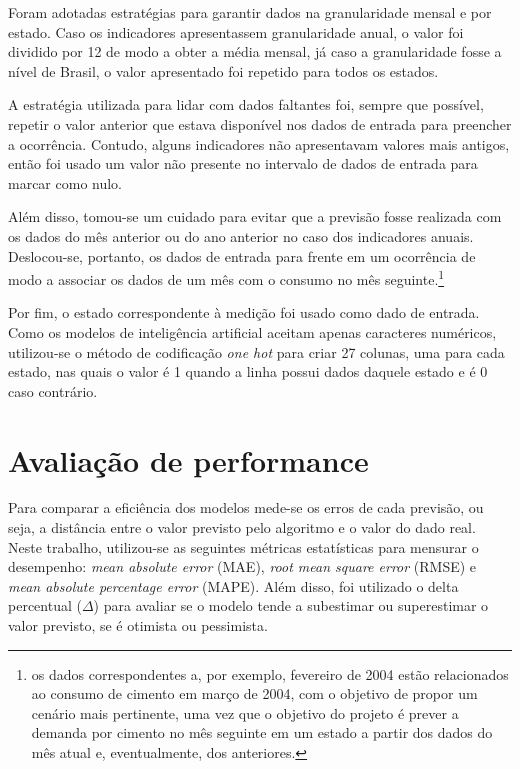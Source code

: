 Foram adotadas estratégias para garantir dados na granularidade
mensal e por estado. Caso os indicadores apresentassem granularidade anual, 
o valor foi dividido por 12 de modo a obter a média mensal, já caso a granularidade
fosse a nível de Brasil, o valor apresentado foi repetido para todos os 
estados.


A estratégia utilizada para lidar com dados faltantes foi, sempre que possível,
repetir o valor anterior que estava disponível nos dados de entrada para
preencher a ocorrência. Contudo, alguns indicadores não apresentavam 
valores mais antigos, então foi usado um valor não presente no intervalo
de dados de entrada para marcar como nulo.

Além disso, tomou-se um cuidado para evitar que a previsão fosse 
realizada com os dados do mês anterior ou do ano anterior no caso dos
indicadores anuais. Deslocou-se, portanto, os dados de entrada 
para frente em um ocorrência de modo a associar os dados de um 
mês com o consumo no mês seguinte.\footnote{os dados correspondentes 
a, por exemplo, fevereiro de 2004 estão relacionados ao consumo de 
cimento em março de 2004, com o objetivo de propor um cenário mais pertinente, 
uma vez que o objetivo do projeto é prever a demanda por cimento no mês seguinte 
em um estado a partir dos dados do mês atual e, eventualmente, dos anteriores.
}

Por fim, o estado correspondente à medição foi usado como dado de entrada. 
Como os modelos de inteligência artificial aceitam apenas caracteres numéricos,
utilizou-se o método de codificação \textit{one hot} para criar 27 colunas, uma
para cada estado, nas quais o valor é 1 quando a linha possui dados daquele estado 
e é 0 caso contrário.


    \section{Avaliação de performance}

    Para comparar a eficiência dos modelos mede-se os erros de 
    cada previsão, ou seja, a distância entre o valor previsto 
    pelo algoritmo e o valor do dado real. Neste trabalho, 
    utilizou-se as seguintes métricas estatísticas para 
    mensurar o desempenho: \textit{mean absolute error} (MAE),
    \textit{root mean square  error} (RMSE) e \textit{mean 
    absolute percentage error} (MAPE). Além disso, foi utilizado
    o delta percentual ($\Delta$) para avaliar se o modelo tende 
    a subestimar ou superestimar o valor previsto, se é otimista
    ou pessimista.

